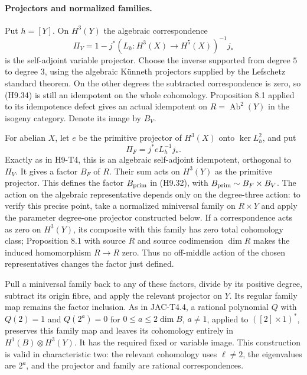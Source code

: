 \paragraph{Projectors and normalized families.}
Put $h=[Y]$. On $H^3(Y)$ the algebraic correspondence
\[
 \Pi_V=1-j^*(L_h:H^3(X)\longrightarrow H^5(X))^{-1}j_*
                                                               \tag{H9.34}
\]
is the self-adjoint variable projector. Choose the inverse supported
from degree $5$ to degree $3$, using the algebraic K\"unneth
projectors supplied by the Lefschetz standard theorem. On the other
degrees the subtracted correspondence is zero, so (H9.34) is still
an idempotent on the whole cohomology. Proposition 8.1 applied to
its idempotence defect gives an actual idempotent on
$R=\operatorname{Ab}^2(Y)$ in the isogeny category. Denote its image
by $B_V$.

For abelian $X$, let $e$ be the primitive projector of $H^3(X)$ onto
$\ker L_h^2$, and put
\[
 \Pi_F=j^*eL_h^{-1}j_*.
\]
Exactly as in H9-T4, this is an algebraic self-adjoint idempotent,
orthogonal to $\Pi_V$. It gives a factor $B_F$ of $R$. Their sum
acts on $H^3(Y)$ as the primitive projector. This defines the factor
$B_{\rm prim}$ in (H9.32), with
$B_{\rm prim}\sim B_F\times B_V$. The action on the algebraic
representative depends only on the degree-three action: to verify
this precise point, take a normalized miniversal family on $R\times Y$
and apply the parameter degree-one projector constructed below. If a
correspondence acts as zero on $H^3(Y)$, its composite with this family
has zero total cohomology class; Proposition 8.1 with source $R$ and
source codimension $\dim R$ makes the induced homomorphism $R\to R$
zero. Thus no off-middle action of the chosen representatives changes
the factor just defined.

Pull a miniversal family back to any of these factors, divide by its
positive degree, subtract its origin fibre, and apply the relevant
projector on $Y$. Its regular family map remains the factor inclusion.
As in JAC-T4.4, a rational polynomial $Q$ with $Q(2)=1$ and
$Q(2^a)=0$ for $0\le a\le2\dim B$, $a\ne1$, applied to
$([2]\times1)^*$, preserves this family map and leaves its cohomology
entirely in $H^1(B)\otimes H^3(Y)$. It has the required fixed or
variable image. This construction is valid in characteristic two:
the relevant cohomology uses $\ell\ne2$, the eigenvalues are $2^a$,
and the projector and family are rational correspondences.

